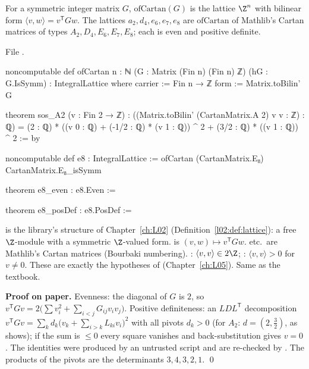 \begin{definition}\label{l23:def:cartanlattice}
For a symmetric integer matrix $G$, $\mathrm{ofCartan}(G)$ is the lattice $\Z^n$ with bilinear form $\langle v,w\rangle=v^{\mathsf T}Gw$.
The lattices $a_2,d_4,e_6,e_7,e_8$ are $\mathrm{ofCartan}$ of Mathlib's Cartan matrices of types $A_2,D_4,E_6,E_7,E_8$; each is even and
positive definite.
\end{definition}
\noindent File .
\begin{leancode}
noncomputable def ofCartan {n : ℕ} (G : Matrix (Fin n) (Fin n) ℤ) (hG : G.IsSymm) :
    IntegralLattice where
  carrier := Fin n → ℤ
  form := Matrix.toBilin' G

theorem sos_A2 (v : Fin 2 → ℤ) :
    ((Matrix.toBilin' (CartanMatrix.A 2) v v : ℤ) : ℚ) =
      (2 : ℚ) * ((v 0 : ℚ) + (-1/2 : ℚ) * (v 1 : ℚ)) ^ 2 + (3/2 : ℚ) * ((v 1 : ℚ)) ^ 2 := by

noncomputable def e8 : IntegralLattice := ofCartan (CartanMatrix.E₈) CartanMatrix.E₈_isSymm

theorem e8_even : e8.Even :=

theorem e8_posDef : e8.PosDef :=
\end{leancode}

\begin{dictionary}
 is the library's structure of Chapter~\ref{ch:L02} (Definition~\ref{l02:def:lattice}): a free $\Z$-module
 with a symmetric $\Z$-valued form.  is $(v,w)\mapsto v^{\mathsf T}Gw$.  etc.\
are Mathlib's Cartan matrices (Bourbaki numbering). : $\langle v,v\rangle\in2\Z$; : $\langle v,v\rangle>0$ for
$v\ne0$. These are exactly the hypotheses of \lean{latticeVOAGen} (Chapter~\ref{ch:L05}). Same as the textbook.
\end{dictionary}

\textbf{Proof on paper.} Evenness: the diagonal of $G$ is $2$, so $v^{\mathsf T}Gv=2\big(\sum v_i^2+\sum_{i<j}G_{ij}v_iv_j\big)$.
Positive definiteness: an $LDL^{\mathsf T}$ decomposition $v^{\mathsf T}Gv=\sum_kd_k\big(v_k+\sum_{i>k}L_{ki}v_i\big)^2$ with all
pivots $d_k>0$ (for $A_2$: $d=(2,\tfrac32)$, as \lean{sos_A2} shows); if the sum is $\le0$ every square vanishes and back-substitution gives
$v=0$. The identities were produced by an untrusted script and are re-checked by \lean{ring}. The products of the pivots are the
determinants $3,4,3,2,1$. \qed

